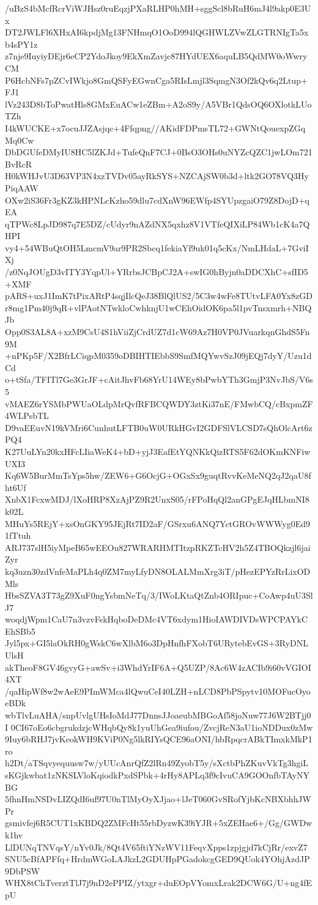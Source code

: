 /uBzS4bMcfRcrViWJHsz0ruEqzjPXaRLHP0hMH+sggScl8bRuH6mJ4l9akp0E3Ux
DT2JWLFl6XHxAI6kpdjMg13FNHmqO1OoD994lQGHWLZVwZLGTRNIgTa5xb4sPY1z
z7nje9IuyiyDEjr6eCP2YdoJkoy9EkXmZavjc87HYdUEX6aquLB5QdMW0oWwryCM
P6HcbNFs7pZCvIWkjo8GmQSFyEGwnCga5RIsLmjl3SqmgN3Of2kQv6q2Ltup+FJ1
lVz243D8bToPwatHls8GMxEuACw1eZBm+A2oS9y/A5VBr1QdsOQ6OXlotkLUoTZh
I4kWUCKE+x7ocuJJZAsjqc+4Ffqpng//AKidFDPmsTL72+GWNtQouexpZGqMq0Cw
DbDGUfeDMyIU8HC5lZKJd+TufeQnF7CJ+0BsO3OHs0uNYZcQZC1jwLOm721BvRcR
H0kWHJvU3D63VP3N4xzTVDv05ayRkSYS+NZCAjSW0b3d+ltk2GO78VQ3HyPiqAAW
OXw2iS36Fr3gKZ3kHPNLcKzho59dlu7cdXnW96EWfp4SYUpzgaiO79Z8DojD+qEA
qTPWc8LpJD987q7E5DZ/cUdyr9nAZdNX5qxhz8V1VTfeQIXiLP84Wb1cK4a7QHPI
vy4+54WBuQtOH5LmcmV9ar9PR2Sbcq1fekiaYf9uk01q5cKx/NmLHdaL+7GviIXj
/z0NqJOUgD3vITY3YqpUl+YRrbsJCBpCJ2A+swIG0hByjn0aDDCXhC+sfID5+XMF
pARS+uxJ1ImK7tPixARtP4sqjIlcQeJ38BlQlUS2/5C3w4wFe8TUtvLFA0Yx8zGD
r8mg1Pm40j9qR+vlPAotNTwkloCwhknjU1wCEhOidOK6pa5l1pvTnsxmrh+NBQJb
Opp0S3AL8A+xzM9CsU4S1hViiZjCrdUZ7d1cW69Az7H0VP0JVuarkqnGhdS5Fn9M
+nPKp5F/X2BfrLCiqpM0359oDBIHTIEbbS9SmfMQYwvSzJ09jEQj7dyY/Uzu1dCd
o+tSfa/TFITl7Ge3GrJF+cAitJhvFb68YrU14WEy8bPwbYTh3GmjP3NvJbS/V6s5
vMAEZ6rYSMbPWUaOLdpMrQvfRFBCQWDY3ztKi37nE/FMwbCQ/cBxpmZF4WLPsbTL
D9vaEEuvN19kVMri6CunhutLFTB0uW0URkHGvI2GDFSlVLCSD7sQhOlcArt6zPQ4
K27UuLYn20kxHFcLIiaWeK4+bD+yjJ3EafEtYQNKkQizRTS5F62dOKmKNFiwUXI3
Kq6W5BurMmTsYps5hw/ZEW6+G6OcjG+OGxSx9guqtRvvKeMeNQ2qJ2qaU8fht6Uf
XnbX1FcxwMDJ/lXoHRP8XzAjPZ9R2UnxS05/rFPoHqQl2anGPgEJqHLbmNI8k02L
MHuYs5REjY+xsOnGKY95JEjRt7ID2aF/GSrxu6ANQ7YctGROvWWWyg0Ed91fTtuh
ARJ737slH5iyMpeB65wEEOu827WRARHMTItzpRKZTcHV2h5Z4TBOQkzjl6jaiZyr
kq3uzn30zdVnfeMaPLh4q0ZM7myLfyDN8OLALMmXrg3iT/pHezEPYzRrLixODMls
HbsSZVA3T73gZ9XuF0ngYsbmNeTq/3/IWoLKtaQtZnb4ORIpuc+CoAwp4uU3SlJ7
woqdjWpm1CaU7n3vzvFskHqboDeDMc4VT6xdym1HioIAWDIVDsWPCPAYkCEhSBb5
Jyl5px+GI5laOkRH0gWskC6wXlbM6o3DpHnfhFXobT6URytebEvGS+3RyDNLUlsH
akTheoF8GV46gvyG+awSv+i3WhdYrIF6A+Q5UZP/8Ac6W4zACIb9i60vVGIOI4XT
/qaHipWf8w2wAeE9PImWMca4lQwuCeI40LZH+nLCD8PbPSpytv10MOFucOyoeBDk
wbTlvLuAHA/snpUvlgUHsIoMdJ77DnnsJJoaeubMBGoAf58joNuw77J6W2BTjj0I
0CI67oEo6cbgrukdzjcWHqbQy8k1yuUhGea9iufou/ZvcjReN3aU1ioNDDux0zMw
9Iuy6bRHJ7jvKeokWH9KViP0Ng5lkRIYsQCE96aONI/hbRpqcrABkTImxkMkP1ro
h2Dt/aTSqvyequusw7w/yUUcAnrQfZ2lRn49ZyobT5y/sXctbPhZKuvVkTg3hgiL
sKGjkwbat1zNKSLVloKqiodkPxdSPbk+4rHy8APLq3f9cIvuCA9GOOnfbTAyNYBG
5fhnHmNSDvLIZQdI6uf97U0nTlMyOyXJjao+lJeT060GvSRofYjbKcNBXbhhJWPr
gsmivfej6R5CUT1xKBDQ2ZMFcHt55rbDyzwK39iYJR+5xZEHae6+/Gg/GWDwk1hv
LlDUNqTNVqsY/nYv0Jk/8Qt4V65ftiYNzWV11FeqvXpps1zpjgjd7kCjRr/exvZ7
SNU5cBfAPFfq+HrdmWGoLAJkzL2GDUHpPGadokcgGED9QUok4YOhjAzdJP9DbPSW
WHX8tChTverztTlJ7j9nD2ePPIZ/ytxgr+duEOpVYomxLrak2DCW6G/U+ng4fEpU
